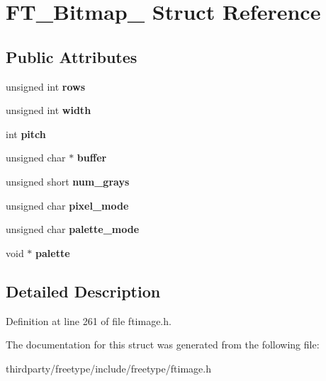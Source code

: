 \hypertarget{struct_f_t___bitmap__}{}\section{F\+T\+\_\+\+Bitmap\+\_\+ Struct Reference}
\label{struct_f_t___bitmap__}
\subsection*{Public Attributes}
\begin{DoxyCompactItemize}
\item 
\mbox{\label{struct_f_t___bitmap___ad857f33f4d12be88746072a7e1455270}} 
unsigned int {\bfseries rows}
\item 
\mbox{\label{struct_f_t___bitmap___a4a3dd62109eb0371f4ca8d196f713e4b}} 
unsigned int {\bfseries width}
\item 
\mbox{\label{struct_f_t___bitmap___afdee595846e1188c7a76d0cec9d85cf2}} 
int {\bfseries pitch}
\item 
\mbox{\label{struct_f_t___bitmap___a76439b1d3c13b81ca506108cd1623284}} 
unsigned char $\ast$ {\bfseries buffer}
\item 
\mbox{\label{struct_f_t___bitmap___a2465f41f8badacca572203c4bdb473e3}} 
unsigned short {\bfseries num\+\_\+grays}
\item 
\mbox{\label{struct_f_t___bitmap___a9bf1180f0b73c4161305ff0166f2652f}} 
unsigned char {\bfseries pixel\+\_\+mode}
\item 
\mbox{\label{struct_f_t___bitmap___a46b396401785e1cd90066f9cd11507f6}} 
unsigned char {\bfseries palette\+\_\+mode}
\item 
\mbox{\label{struct_f_t___bitmap___a8d5ecf4409f71bfb559e0d13d8df4d86}} 
void $\ast$ {\bfseries palette}
\end{DoxyCompactItemize}


\subsection{Detailed Description}


Definition at line 261 of file ftimage.\+h.



The documentation for this struct was generated from the following file\+:\begin{DoxyCompactItemize}
\item 
thirdparty/freetype/include/freetype/ftimage.\+h\end{DoxyCompactItemize}
